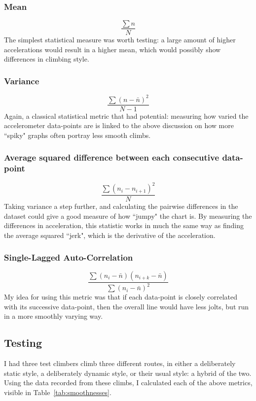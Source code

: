 \subsubsection{Mean}
$$\frac{\sum n }{N}$$
The simplest statistical measure was worth testing: a large amount of higher accelerations would result in a higher mean, which would possibly show differences in climbing style.

\subsubsection{Variance}
$$\frac{\sum (n - \bar{n} )^2 }{N-1}$$
Again, a classical statistical metric that had potential: measuring how varied the accelerometer data-points are is linked to the above discussion on how more ``spiky" graphs often portray less smooth climbs.

\subsubsection{Average squared difference between each consecutive data-point}
$$\frac{\sum (n_i - n_{i+1} )^2 }{N}$$
Taking variance a step further, and calculating the pairwise differences in the dataset could give a good measure of how ``jumpy" the chart is.
By measuring the differences in acceleration, this statistic works in much the same way as finding the average squared ``jerk", which is the derivative of the acceleration.

\subsubsection{Single-Lagged Auto-Correlation}
$$
\frac{\sum(n_{i} - \bar{n})(n_{i+k} - \bar{n})}
      {\sum(n_{i} - \bar{n})^{2} }
$$
My idea for using this metric was that if each data-point is closely correlated with its successive data-point, then the overall line would have less jolts, but run in a more smoothly varying way.

\subsection {Testing}
I had three test climbers climb three different routes, in either a deliberately static style, a deliberately dynamic style, or their usual style: a hybrid of the two.
Using the data recorded from these climbs, I calculated each of the above metrics, visible in Table~\ref{tab:smoothnesses}.

